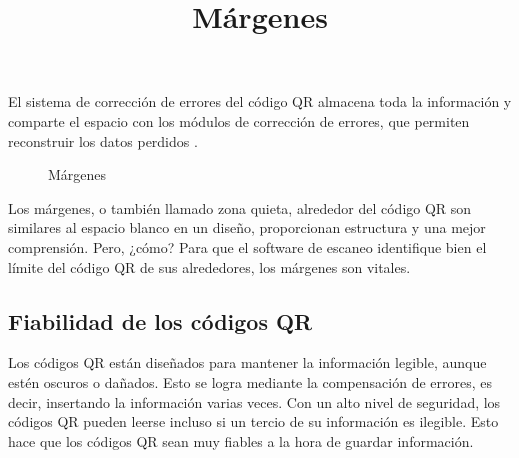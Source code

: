 El sistema de corrección de errores del código QR almacena toda la información y comparte el espacio con los módulos de corrección de errores, que permiten reconstruir los datos perdidos\cite{CitaA01} . \\

\title{Márgenes}

\begin{figure}[htbp]
	\begin{center}
		\caption{Márgenes \cite{CitaA01}}
		\label{fig:margenes}
	\end{center}
\end{figure}

Los márgenes, o también llamado zona quieta, alrededor del código QR son similares al espacio blanco en un diseño, proporcionan estructura y una mejor comprensión. Pero, ¿cómo? Para que el software de escaneo identifique bien el límite del código QR de sus alrededores, los márgenes son vitales.

\subsection{Fiabilidad de los códigos QR}
Los códigos QR están diseñados para mantener la información legible, aunque estén oscuros o dañados. Esto se logra mediante la compensación de errores, es decir, insertando la información varias veces. Con un alto nivel de seguridad, los códigos QR pueden leerse incluso si un tercio de su información es ilegible. Esto hace que los códigos QR sean muy fiables a la hora de guardar información. \\

